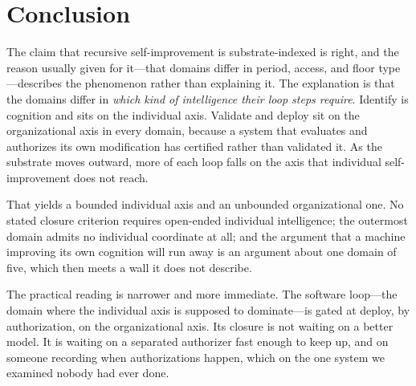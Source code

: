 \documentclass[11pt]{article}
\begin{document}
\section{Conclusion}

The claim that recursive self-improvement is substrate-indexed is right, and the reason usually given for it---that domains differ in period, access, and floor type---describes the phenomenon rather than explaining it. The explanation is that the domains differ in \emph{which kind of intelligence their loop steps require}. Identify is cognition and sits on the individual axis. Validate and deploy sit on the organizational axis in every domain, because a system that evaluates and authorizes its own modification has certified rather than validated it. As the substrate moves outward, more of each loop falls on the axis that individual self-improvement does not reach.

That yields a bounded individual axis and an unbounded organizational one. No stated closure criterion requires open-ended individual intelligence; the outermost domain admits no individual coordinate at all; and the argument that a machine improving its own cognition will run away is an argument about one domain of five, which then meets a wall it does not describe.

The practical reading is narrower and more immediate. The software loop---the domain where the individual axis is supposed to dominate---is gated at deploy, by authorization, on the organizational axis. Its closure is not waiting on a better model. It is waiting on a separated authorizer fast enough to keep up, and on someone recording when authorizations happen, which on the one system we examined nobody had ever done.



\end{document}
